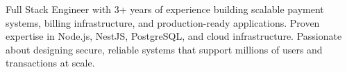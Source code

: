 \documentclass[letter,10pt]{article}
\begin{document}
Full Stack Engineer with 3+ years of experience building scalable payment systems, billing infrastructure, and production-ready applications. Proven expertise in Node.js, NestJS, PostgreSQL, and cloud infrastructure. Passionate about designing secure, reliable systems that support millions of users and transactions at scale.
\end{document}
